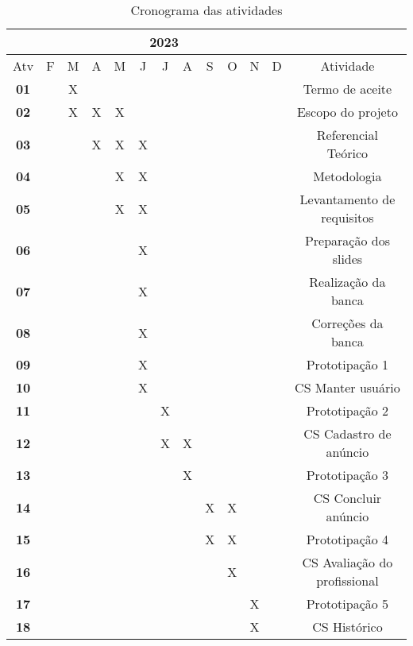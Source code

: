 \begin{table*}[ht]
\centering
\caption{Cronograma das atividades}
\label{tab:cronograma}
    \begin{tabular}{|c|c|c|c|c|c|c|c|c|c|c|c|c|}
        \hline & \multicolumn{11}{|c|}{2023} & \multicolumn{1}{|c|}{} \\
        \hline \multicolumn{1}{|c|}{Atv} & F & M & A & M & J & J & A & S & O & N & D & {Atividade} \\
        \hline \textbf{01} & & X& & & & & & & & & & Termo de aceite \\
        \hline \textbf{02} & & X& X& X& & & & & & & & Escopo do projeto \\
        \hline \textbf{03} & & & X& X& X& & & & & & & Referencial Teórico\\
        \hline \textbf{04} & & & & X& X& & & & & & & Metodologia\\
        \hline \textbf{05} & & & & X& X& & & & & & & Levantamento de requisitos\\
        \hline \textbf{06} & & & & & X& & & & & & & Preparação dos slides\\
        \hline \textbf{07} & & & & & X& & & & & & & Realização da banca\\
        \hline \textbf{08} & & & & & X& & & & & & & Correções da banca\\
        \hline \textbf{09} & & & & & X& & & & & & & Prototipação 1\\
        \hline \textbf{10} & & & & & X& & & & & & & CS Manter usuário\\
        \hline \textbf{11} & & & & & & X& & & & & & Prototipação 2\\
        \hline \textbf{12} & & & & & & X& X& & & & & CS Cadastro de anúncio\\
        \hline \textbf{13} & & & & & & & X& & & & & Prototipação 3\\
        \hline \textbf{14} & & & & & & & & X& X& & & CS Concluir anúncio\\
        \hline \textbf{15} & & & & & & & & X& X& & & Prototipação 4\\
        \hline \textbf{16} & & & & & & & & & X& & & CS Avaliação do profissional\\
        \hline \textbf{17} & & & & & & & & & & X& & Prototipação 5\\
        \hline \textbf{18} & & & & & & & & & & X& & CS Histórico\\
        \hline
    \end{tabular} 
\end{table*}

    
    
    